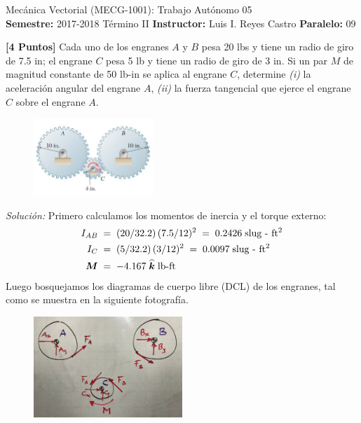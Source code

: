 \documentclass[ a4paper, twoside, 11pt]{article}
\newcommand{\numero}{05}
\begin{document}
\allowdisplaybreaks

\begin{center}
\Large Mec\'anica Vectorial (MECG-1001): Trabajo Aut\'onomo \numero \\[2ex]
\small \textbf{Semestre:} 2017-2018 T\'ermino II \qquad
\textbf{Instructor:} Luis I. Reyes Castro \qquad
\textbf{Paralelo:} 09
\end{center}
\fullskip

\begin{problem}
\textbf{[4 Puntos]} Cada uno de los engranes $A$ y $B$ pesa 20 lbs y tiene un radio de giro de 7.5 in; el engrane $C$ pesa 5 lb y tiene un radio de giro de 3 in. Si un par $M$ de magnitud constante de 50 lb-in se aplica al engrane $C$, determine \textit{(i)} la aceleraci\'on angular del engrane $A$, \linebreak \textit{(ii)} la fuerza tangencial que ejerce el engrane $C$ sobre el engrane $A$.

\begin{figure}[htb]
\centering
\includegraphics[width=0.4\textwidth]{problema-1.jpg}
\end{figure}

\emph{Soluci\'on:} Primero calculamos los momentos de inercia y el torque externo: 
\begin{align*}
I_{AB} \; & = \; (20/32.2) \, (7.5/12)^2 \; = \;
0.2426 \; \text{slug - ft\ensuremath{^{\text{2}}}} \\
I_{C} \; & = \; (5/32.2) \, (3/12)^2 \; = \;
0.0097 \; \text{slug - ft\ensuremath{^{\text{2}}}} \\
{\boldsymbol{M}} \; & = \; -4.167 \; {\boldsymbol{\widehat{k}}} \; \text{lb-ft}
\end{align*}
Luego bosquejamos los diagramas de cuerpo libre (DCL) de los engranes, tal como se muestra en la siguiente fotograf\'ia. 
\begin{figure}[htb]
\centering
\includegraphics[width=0.5\textwidth]{problema-1_DCL.jpg}
\end{figure}


\end{problem}
\end{document}

